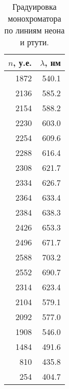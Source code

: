 \begin{table}[ht]
    \centering
    \caption{Градуировка монохроматора по линиям неона и ртути.}
\begin{tabular}{rr}
\toprule
  $n$, у.е. &   $\lambda$, нм \\
\midrule
1872 & 540.1 \\
2136 & 585.2 \\
2154 & 588.2 \\
2230 & 603.0 \\
2254 & 609.6 \\
2288 & 616.4 \\
2308 & 621.7 \\
2334 & 626.7 \\
2364 & 633.4 \\
2384 & 638.3 \\
2426 & 653.3 \\
2496 & 671.7 \\
2588 & 703.2 \\
2552 & 690.7 \\
2314 & 623.4 \\
2104 & 579.1 \\
2092 & 577.0 \\
1908 & 546.0 \\
1484 & 491.6 \\
 810 & 435.8 \\
 254 & 404.7 \\
\bottomrule
\end{tabular}

\end{table}






